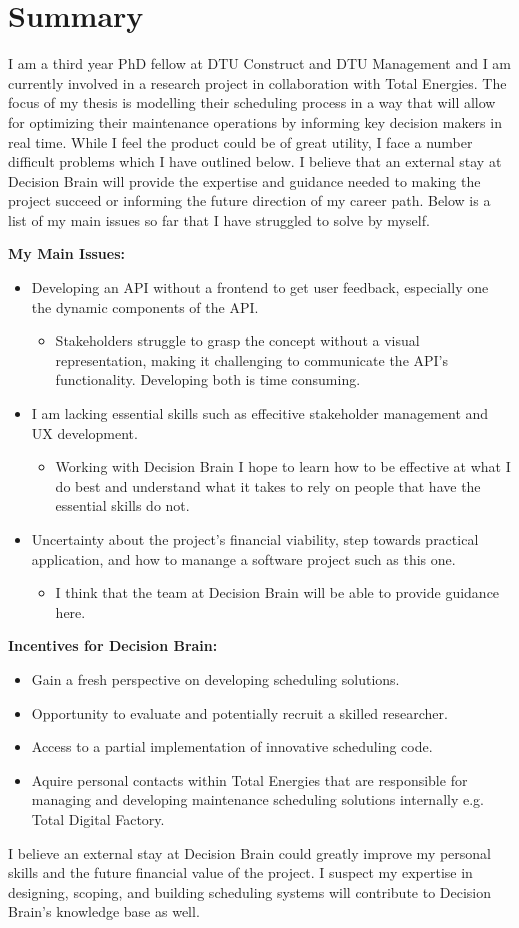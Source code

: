 \section{Summary}
I am a third year PhD fellow at DTU Construct and DTU Management and I am currently involved in a research project in collaboration with Total Energies. The focus of my thesis is modelling 
their scheduling process in a way that will allow for optimizing their maintenance operations by informing key decision makers in real time. While I feel
the product could be of great utility, I face a number difficult problems which I have outlined below. I believe that an external stay at Decision Brain will provide the 
expertise and guidance needed to making the project succeed or informing the future direction of my career path. 
Below is a list of my main issues so far that I have struggled to solve by myself. 

\textbf{My Main Issues:}
\begin{itemize}
	\item Developing an API without a frontend to get user feedback, especially one the dynamic components of the API.
	\begin{itemize}
		\item Stakeholders struggle to grasp the concept without a visual representation, making it challenging to communicate the API's functionality. Developing both is time consuming.
	\end{itemize}
	\item I am lacking essential skills such as effecitive stakeholder management and UX development. 
	\begin{itemize}
		\item Working with Decision Brain I hope to learn how to be effective at what I do best and understand what it takes to 
			  rely on people that have the essential skills do not.
	\end{itemize}
	\item Uncertainty about the project's financial viability, step towards practical application, and how to manange a software project such as this one.
	\begin{itemize}
		\item I think that the team at Decision Brain will be able to provide guidance here.
	\end{itemize}
\end{itemize}

\textbf{Incentives for Decision Brain:} 
\begin{itemize} 
	\item Gain a fresh perspective on developing scheduling solutions. 
	\item Opportunity to evaluate and potentially recruit a skilled researcher. 
	\item Access to a partial implementation of innovative scheduling code.
	\item Aquire personal contacts within Total Energies that are responsible for managing and developing maintenance scheduling solutions internally e.g. Total Digital Factory.
\end{itemize}

I believe an external stay at Decision Brain could greatly improve my personal skills and the future financial value of the project.
I suspect my expertise in designing, scoping, and building scheduling systems will contribute to Decision Brain's knowledge base as well.
